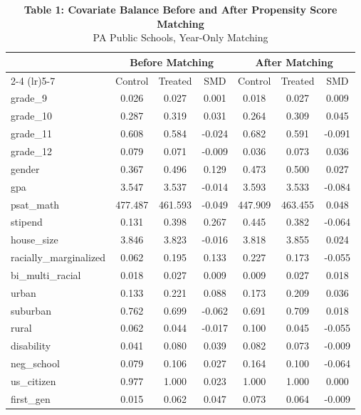\begin{table}[t]
\caption*{
{\fontsize{10}{12}\selectfont  \textbf{Table 1: Covariate Balance Before and After Propensity Score Matching}\fontsize{8}{10}\selectfont } \\ 
{\fontsize{8}{10}\selectfont  PA Public Schools, Year-Only Matching\fontsize{8}{10}\selectfont }
} 
\fontsize{8.0pt}{10.0pt}\selectfont
\begin{tabular*}{\linewidth}{@{\extracolsep{\fill}}l|cccccc}
\toprule
 & \multicolumn{3}{c}{Before Matching} & \multicolumn{3}{c}{After Matching} \\ 
\cmidrule(lr){2-4} \cmidrule(lr){5-7}
 & Control & Treated & SMD & Control & Treated & SMD \\ 
\midrule\addlinespace[2.5pt]
grade\_9 & {0.026} & {0.027} & {0.001} & {0.018} & {0.027} & {0.009} \\ 
grade\_10 & 0.287 & 0.319 & 0.031 & 0.264 & 0.309 & 0.045 \\ 
grade\_11 & 0.608 & 0.584 & -0.024 & 0.682 & 0.591 & -0.091 \\ 
grade\_12 & 0.079 & 0.071 & -0.009 & 0.036 & 0.073 & 0.036 \\ 
gender & 0.367 & 0.496 & 0.129 & 0.473 & 0.500 & 0.027 \\ 
gpa & 3.547 & 3.537 & -0.014 & 3.593 & 3.533 & -0.084 \\ 
psat\_math & 477.487 & 461.593 & -0.049 & 447.909 & 463.455 & 0.048 \\ 
stipend & 0.131 & 0.398 & 0.267 & 0.445 & 0.382 & -0.064 \\ 
house\_size & 3.846 & 3.823 & -0.016 & 3.818 & 3.855 & 0.024 \\ 
racially\_marginalized & 0.062 & 0.195 & 0.133 & 0.227 & 0.173 & -0.055 \\ 
bi\_multi\_racial & 0.018 & 0.027 & 0.009 & 0.009 & 0.027 & 0.018 \\ 
urban & 0.133 & 0.221 & 0.088 & 0.173 & 0.209 & 0.036 \\ 
suburban & 0.762 & 0.699 & -0.062 & 0.691 & 0.709 & 0.018 \\ 
rural & 0.062 & 0.044 & -0.017 & 0.100 & 0.045 & -0.055 \\ 
disability & 0.041 & 0.080 & 0.039 & 0.082 & 0.073 & -0.009 \\ 
neg\_school & 0.079 & 0.106 & 0.027 & 0.164 & 0.100 & -0.064 \\ 
us\_citizen & 0.977 & 1.000 & 0.023 & 1.000 & 1.000 & 0.000 \\ 
first\_gen & 0.015 & 0.062 & 0.047 & 0.073 & 0.064 & -0.009 \\ 

\end{tabular*}
\end{table}

